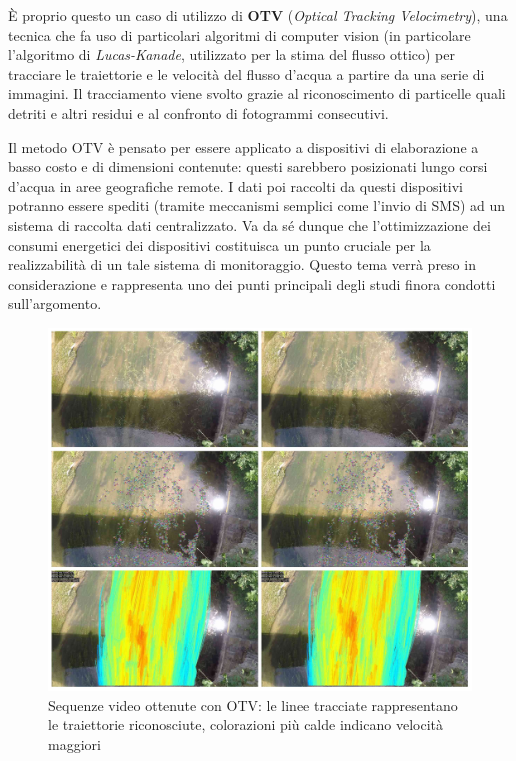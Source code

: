 È proprio questo un caso di utilizzo di \textbf{OTV} (\textit{Optical Tracking Velocimetry}), una tecnica che fa uso di 
particolari algoritmi di computer vision (in particolare l'algoritmo di \textit{Lucas-Kanade}, utilizzato per la stima 
del flusso ottico) per tracciare le traiettorie e le velocità del flusso d'acqua a partire da una serie di immagini. 
Il tracciamento viene svolto grazie al riconoscimento di particelle quali detriti e altri residui e al confronto di fotogrammi 
consecutivi.

Il metodo OTV è pensato per essere applicato a dispositivi di elaborazione a basso costo e di dimensioni contenute: questi
sarebbero posizionati lungo corsi d'acqua in aree geografiche remote. I dati poi raccolti da questi dispositivi potranno essere
spediti (tramite meccanismi semplici come l'invio di SMS) ad un sistema di raccolta dati centralizzato.
Va da sé dunque che l'ottimizzazione dei consumi energetici dei dispositivi costituisca un punto cruciale per la 
realizzabilità di un tale sistema di monitoraggio. Questo tema verrà preso in considerazione e rappresenta uno dei punti
principali degli studi finora condotti sull'argomento.

\begin{figure}[h!]
    \begin{center}
        \includegraphics[scale=0.13]{img/sequenze_video_otv.jpg}
        \caption{Sequenze video ottenute con OTV: le linee tracciate rappresentano le traiettorie riconosciute, colorazioni
        più calde indicano velocità maggiori}
    \end{center}
\end{figure}

